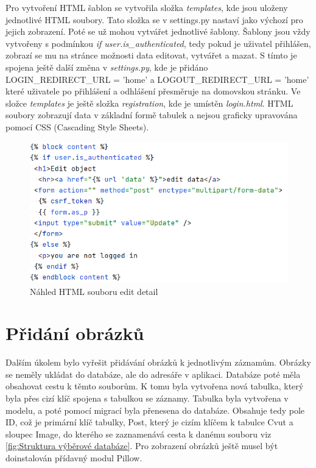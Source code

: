Pro vytvoření HTML šablon se vytvořila složka \emph{templates}, kde
jsou uloženy jednotlivé HTML soubory. Tato složka se v settings.py
nastaví jako výchozí pro jejich zobrazení. Poté se už mohou vytvářet
jednotlivé šablony. Šablony jsou vždy vytvořeny s podmínkou \emph{if
  user.is\_authenticated}, tedy pokud je uživatel přihlášen, zobrazí
se mu na stránce možnosti data editovat, vytvářet a mazat. S tímto je
spojena ještě další změna v \emph{settings.py}, kde je přidáno
LOGIN\_REDIRECT\_URL = 'home' a LOGOUT\_REDIRECT\_URL
  = 'home' které uživatele po přihlášení a odhlášení přesměruje na
domovskou stránku. Ve složce \emph{templates} je ještě složka
\emph{registration}, kde je umístěn \emph{login.html}. HTML soubory
zobrazují data v základní formě tabulek a nejsou graficky upravována
pomocí CSS (Cascading Style Sheets).

\begin{figure}[H] \centering
    \includegraphics[width=350pt]{./pictures/8-edit-detail-html.PNG}
    \caption[Náhled HTML souboru edit detail]{Náhled HTML souboru edit detail}
	\label{fig:Náhled HTML souboru edit detail}
\end{figure}


\newpage

\section{Přidání obrázků}
\label{Přidání obrázků}

Dalším úkolem bylo vyřešit přidávání obrázků k jednotlivým
záznamům. Obrázky se neměly ukládat do databáze, ale do adresáře v
aplikaci. Databáze poté měla obsahovat cestu k těmto souborům. K tomu
byla vytvořena nová tabulka, který byla přes cizí klíč spojena s
tabulkou se záznamy. Tabulka byla vytvořena v modelu, a poté pomocí
migrací byla přenesena do databáze. Obsahuje tedy pole ID, což je
primární klíč tabulky, Post, který je cizím klíčem k tabulce Cvut a
sloupec Image, do kterého se zaznamenává cesta k danému souboru viz \ref{fig:Struktura výběrové databáze}.
Pro zobrazení obrázků ještě musel být doinstalován přídavný modul Pillow.


